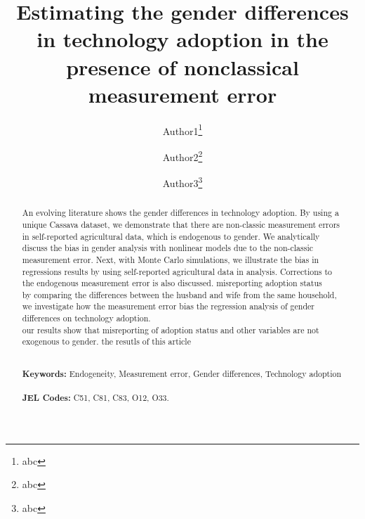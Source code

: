 \documentclass[12pt]{article}
\begin{document}

	\begin{titlepage}
		\title{Estimating the gender differences in technology adoption in the presence of nonclassical measurement error}
		\author{Author1\thanks{abc} \and Author2\thanks{abc} \and Author3\thanks{abc}}
		\maketitle
		\begin{abstract}
			\noindent An evolving literature shows the gender differences in technology adoption. By using a unique Cassava dataset, we demonstrate that there are non-classic measurement errors in self-reported agricultural data, which is endogenous to gender. We analytically discuss the bias in gender analysis with nonlinear models due to the non-classic measurement error. Next, with Monte Carlo simulations, we illustrate the bias in regressions results by using self-reported agricultural data in analysis. Corrections to the endogenous measurement error is also discussed.
			misreporting adoption status\\
			by comparing the differences between the husband and wife from the same household, we investigate how the measurement error bias the regression analysis of gender differences on technology adoption. \\
			
			our results show that misreporting of adoption status and other variables are not exogenous to gender. the resutls of this article 
			
			\vspace{0in}\\
			\noindent\textbf{Keywords:} Endogeneity, Measurement error, Gender differences, Technology adoption\\
			\vspace{0in}\\
			\noindent\textbf{JEL Codes:} C51, C81, C83, O12, O33.\\
			
			\bigskip
		\end{abstract}
		\setcounter{page}{0}
		\thispagestyle{empty}
	\end{titlepage}
	\pagebreak \newpage
	
\end{document}
